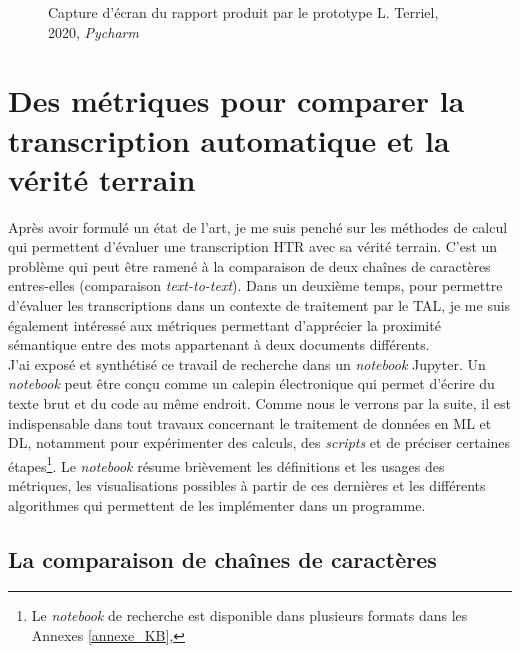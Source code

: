 \begin{figure}[h]
    \centering
    \centerline{}
    \caption{Capture d'écran du rapport produit par le prototype  \textcopyright L. Terriel, 2020, \textit{Pycharm}}
    \label{fig:cerwer}
\end{figure}

\newpage
\section{Des métriques pour comparer la transcription automatique et la vérité terrain}\label{metriques}

Après avoir formulé un état de l'art, je me suis penché sur les méthodes de calcul qui permettent d'évaluer une transcription HTR avec sa vérité terrain. C'est un problème qui peut être ramené à la comparaison de deux chaînes de caractères entres-elles (comparaison \textit{text-to-text}). Dans un deuxième temps, pour permettre d'évaluer les transcriptions dans un contexte de traitement par le TAL, je me suis également intéressé aux métriques permettant d'apprécier la proximité sémantique entre des mots appartenant à deux documents différents.\\

J'ai exposé et synthétisé ce travail de recherche dans un \textit{notebook} Jupyter. Un \textit{notebook} peut être conçu comme un calepin électronique qui permet d'écrire du texte brut et du code au même endroit. Comme nous le verrons par la suite, il est indispensable dans tout travaux concernant le traitement de données en ML et DL, notamment pour expérimenter des calculs, des \textit{scripts} et de préciser certaines étapes\footnote{Le \textit{notebook} de recherche est disponible dans plusieurs formats dans les Annexes \ref{annexe_KB},  }. Le \textit{notebook} résume brièvement les définitions et les usages des métriques, les visualisations possibles à partir de ces dernières et les différents algorithmes qui permettent de les implémenter dans un programme.\\

\subsection{La comparaison de chaînes de caractères}

